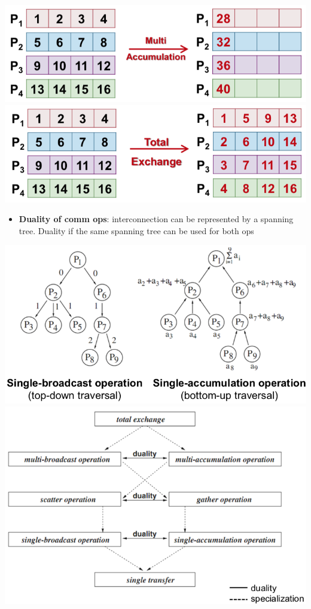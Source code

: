 \documentclass[10pt,landscape,a4paper]{article}
\begin{document}
\begin{multicols*}{4}
\includegraphics[width=0.33\linewidth]{multiaccu}
\includegraphics[width=0.33\linewidth]{totalexch}
  \begin{itemize}
    \item \textbf{Duality of comm ops}: interconnection can be represented by a spanning tree. Duality if the same spanning tree can be used for both ops
  \end{itemize}
\includegraphics[width=0.5\linewidth]{duality1}
\includegraphics[width=0.5\linewidth]{duality2}

\end{multicols*}
\end{document}
